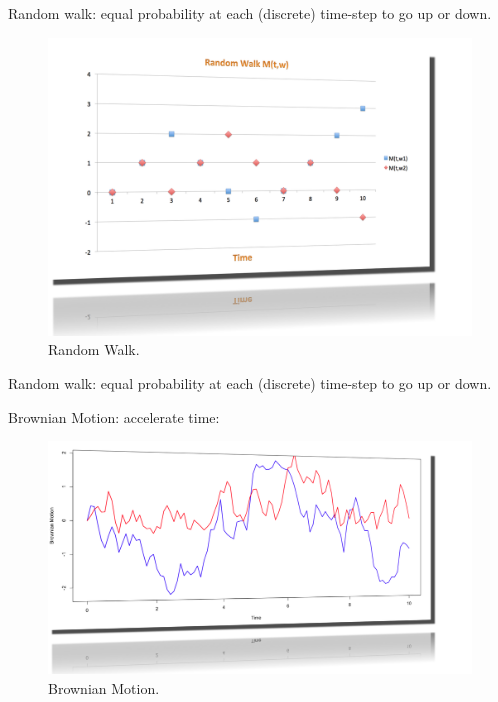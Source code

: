 \documentclass{beamer}
\begin{document}
\begin{frame}[shrink=30]{{\color{cyan}{\large Option Pricing in a Liquid Market: what is Brownian Motion?}}}
\bigskip
Random walk: equal probability at each (discrete) time-step to go up or down.

\vspace{10pt}
\begin{figure}[H]
\begin{center}
	\includegraphics[height=0.8\textheight]{Random_Walk.png}
\caption{Random Walk.}
\label{fig:random_walk}
\end{center}
\end{figure} 

\end{frame}

\begin{frame}[shrink=30]{{\color{cyan}{\large Option Pricing in a Liquid Market: what is Brownian Motion?}}}
\bigskip
Random walk: equal probability at each (discrete) time-step to go up or down.

\vspace{8pt}
Brownian Motion: accelerate time:
\vspace{10pt}
\begin{figure}[H]
\begin{center}
	\includegraphics[height=0.8\textheight]{Brownian_Motion_2.png}
\caption{Brownian Motion.}
\label{fig:brownian_motion}
\end{center}
\end{figure} 

\end{frame}
\end{document}
